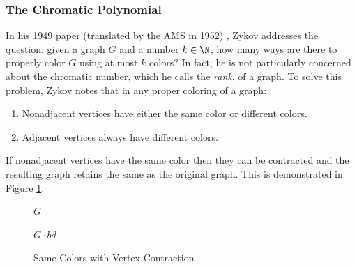 \subsubsection{The Chromatic Polynomial}

In his 1949 paper (translated by the AMS in 1952) \cite{zykov}, Zykov addresses the question: given a graph \(G\) and
a number \(k\in\N\), how many ways are there to properly color \(G\) using at most \(k\) colors?  In fact, he is not
particularly concerned about the chromatic number, which he calls the \emph{rank}, of a graph.  To solve this problem,
Zykov notes that in any proper coloring of a graph:
\begin{enumerate}
\item Nonadjacent vertices have either the same color or different colors.
\item Adjacent vertices always have different colors.
\end{enumerate}
If nonadjacent vertices have the same color then they can be contracted and the resulting graph retains the same
 as the original graph.  This is demonstrated in Figure \ref{fig:zvcon}.

\begin{figure}[h]
  \label{fig:zvcon}
  \begin{center}
    \begin{minipage}{2in}
      \begin{center}

        \bigskip

        \(G\)
      \end{center}
    \end{minipage}
    \begin{minipage}{2in}
      \begin{center}

        \bigskip

        \(G\cdot bd\)
      \end{center}
    \end{minipage}
  \end{center}
  \caption{Same Colors with Vertex Contraction}
\end{figure}

